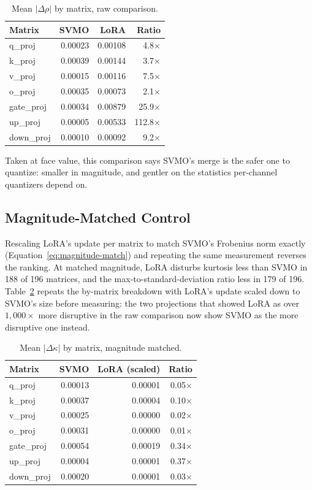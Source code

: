 \documentclass[conference]{IEEEtran}
\begin{document}
\begin{table}[t]
\centering
\caption{Mean $|\Delta\rho|$ by matrix, raw comparison.}
\label{tab:bytype-raw-rho}
\begin{tabular}{@{}lrrr@{}}
\toprule
Matrix & SVMO & LoRA & Ratio \\
\midrule
q\_proj & 0.00023 & 0.00108 & 4.8$\times$ \\
k\_proj & 0.00039 & 0.00144 & 3.7$\times$ \\
v\_proj & 0.00015 & 0.00116 & 7.5$\times$ \\
o\_proj & 0.00035 & 0.00073 & 2.1$\times$ \\
gate\_proj & 0.00034 & 0.00879 & 25.9$\times$ \\
up\_proj & 0.00005 & 0.00533 & 112.8$\times$ \\
down\_proj & 0.00010 & 0.00092 & 9.2$\times$ \\
\bottomrule
\end{tabular}
\end{table}

Taken at face value, this comparison says SVMO's merge is the safer one to quantize: smaller in magnitude, and gentler on the statistics per-channel quantizers depend on.

\subsection{Magnitude-Matched Control}

Rescaling LoRA's update per matrix to match SVMO's Frobenius norm exactly (Equation~\ref{eq:magnitude-match}) and repeating the same measurement reverses the ranking. At matched magnitude, LoRA disturbs kurtosis less than SVMO in 188 of 196 matrices, and the max-to-standard-deviation ratio less in 179 of 196. Table~\ref{tab:bytype-matched} repeats the by-matrix breakdown with LoRA's update scaled down to SVMO's size before measuring: the two projections that showed LoRA as over $1{,}000\times$ more disruptive in the raw comparison now show SVMO as the more disruptive one instead.

\begin{table}[t]
\centering
\caption{Mean $|\Delta\kappa|$ by matrix, magnitude matched.}
\label{tab:bytype-matched}
\begin{tabular}{@{}lrrr@{}}
\toprule
Matrix & SVMO & LoRA (scaled) & Ratio \\
\midrule
q\_proj & 0.00013 & 0.00001 & 0.05$\times$ \\
k\_proj & 0.00037 & 0.00004 & 0.10$\times$ \\
v\_proj & 0.00025 & 0.00000 & 0.02$\times$ \\
o\_proj & 0.00031 & 0.00000 & 0.01$\times$ \\
gate\_proj & 0.00054 & 0.00019 & 0.34$\times$ \\
up\_proj & 0.00004 & 0.00001 & 0.37$\times$ \\
down\_proj & 0.00020 & 0.00001 & 0.03$\times$ \\
\bottomrule
\end{tabular}
\end{table}
\end{document}
